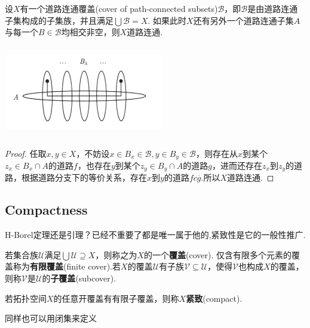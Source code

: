 \begin{theorem}
设$X$有一个道路连通覆盖(cover of path-connected subsets)$\mathscr{B}$，即$\mathscr{B}$是由道路连通子集构成的子集族，并且满足$\bigcup \mathscr{B} = X$. 如果此时$X$还有另外一个道路连通子集$A$与每一个$B \in \mathscr{B}$均相交非空，则$X$道路连通.

\begin{center}
\includegraphics[width=7cm, height=4cm]{images/cover_of_path_connected_subsets.png}
\end{center}

\end{theorem}

\begin{proof}
任取$x,y \in X$，不妨设$x \in B_x \in \mathscr{B},y \in B_y \in \mathscr{B}$，则存在从$x$到某个$z_x \in B_x \cap A$的道路$f$，也存在$y$到某个$z_y \in B_y \cap A$的道路$g$，进而还存在$z_x$到$z_y$的道路，根据道路分支下的等价关系，存在$x$到$y$的道路$fc\overline{g}$.所以$X$道路连通.
\end{proof}


\newpage
\subsection{Compactness}

\rm H-Borel定理还是引理？已经不重要了都是唯一属于他的,紧致性是它的一般性推广.

\begin{definition}
若集合族$\mathcal{U}$满足$\bigcup\mathcal{U} \supseteq X$，则称之为$X$的一个\textbf{覆盖}(\rm cover). 仅含有限多个元素的覆盖称为\textbf{有限覆盖}(finite cover).若$X$的覆盖$\mathcal{U}$有子族$\mathcal{V} \subseteq \mathcal{U}$，使得$\mathcal{V}$也构成$X$的覆盖，则称$\mathcal{V}$是$\mathcal{U}$的\textbf{子覆盖}(subcover).
\end{definition}


\begin{definition}
若拓扑空间$X$的任意开覆盖有有限子覆盖，则称$X$\textbf{紧致}(\rm compact).
\end{definition}

同样也可以用闭集来定义

